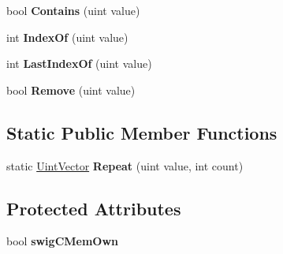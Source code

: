 \begin{DoxyCompactItemize}
\item 
\hypertarget{class_uint_vector_a03f6285737be9aa37fae9413da72e139}{bool {\bfseries Contains} (uint value)}\label{class_uint_vector_a03f6285737be9aa37fae9413da72e139}

\item 
\hypertarget{class_uint_vector_a40ded9f22a1c4e9f51695c54a8cb7090}{int {\bfseries Index\+Of} (uint value)}\label{class_uint_vector_a40ded9f22a1c4e9f51695c54a8cb7090}

\item 
\hypertarget{class_uint_vector_aa8c09638d06b819267add34c20fac221}{int {\bfseries Last\+Index\+Of} (uint value)}\label{class_uint_vector_aa8c09638d06b819267add34c20fac221}

\item 
\hypertarget{class_uint_vector_aebef562f036132c5fc067fb42f688725}{bool {\bfseries Remove} (uint value)}\label{class_uint_vector_aebef562f036132c5fc067fb42f688725}

\end{DoxyCompactItemize}
\subsection*{Static Public Member Functions}
\begin{DoxyCompactItemize}
\item 
\hypertarget{class_uint_vector_a89ef42a2435bcb6a48fa083c1c455931}{static \hyperlink{class_uint_vector}{Uint\+Vector} {\bfseries Repeat} (uint value, int count)}\label{class_uint_vector_a89ef42a2435bcb6a48fa083c1c455931}

\end{DoxyCompactItemize}
\subsection*{Protected Attributes}
\begin{DoxyCompactItemize}
\item 
\hypertarget{class_uint_vector_ad03b84ea7cf0bff0f6b4c3f0e6e8f61e}{bool {\bfseries swig\+C\+Mem\+Own}}\label{class_uint_vector_ad03b84ea7cf0bff0f6b4c3f0e6e8f61e}

\end{DoxyCompactItemize}
